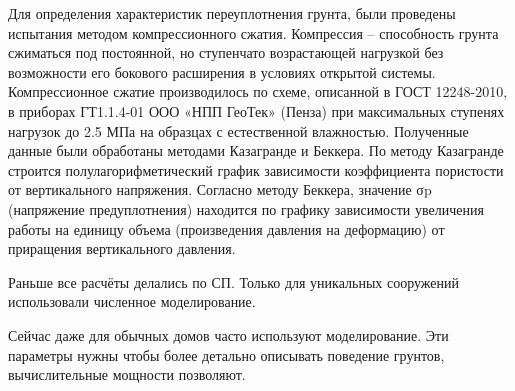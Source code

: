 Для определения характеристик переуплотнения грунта, были проведены испытания методом компрессионного сжатия. Компрессия – способность грунта сжиматься под постоянной, но ступенчато возрастающей нагрузкой без возможности его бокового расширения в условиях открытой системы. Компрессионное сжатие производилось по схеме, описанной в ГОСТ 12248-2010, в приборах ГТ1.1.4-01 ООО «НПП ГеоТек» (Пенза) при максимальных ступенях нагрузок до 2.5 МПа на образцах с естественной влажностью. 
Полученные данные были обработаны методами Казагранде и Беккера. По методу Казагранде строится полулагорифметический график зависимости коэффициента пористости от вертикального напряжения. Согласно методу Беккера, значение σp (напряжение предуплотнения) находится по графику зависимости увеличения работы на единицу объема (произведения давления на деформацию) от приращения вертикального давления.



Раньше все расчёты делались по СП. Только для уникальных сооружений использовали численное моделирование.

Сейчас даже для обычных домов часто используют моделирование. Эти параметры нужны чтобы более детально описывать поведение грунтов, вычислительные мощности позволяют.